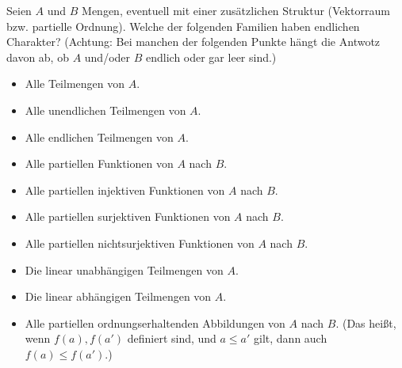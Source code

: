 
\begin{exercise}[280]

Seien $A$ und $B$ Mengen, eventuell mit einer zusätzlichen Struktur
(Vektorraum bzw. partielle Ordnung). Welche der folgenden Familien haben endlichen
Charakter? (Achtung: Bei manchen der folgenden Punkte hängt die Antwotz davon ab,
ob $A$ und/oder $B$ endlich oder gar leer sind.)

\begin{itemize}
  \item Alle Teilmengen von $A$.
  \item Alle unendlichen Teilmengen von $A$.
  \item Alle endlichen Teilmengen von $A$.
  \item Alle partiellen Funktionen von $A$ nach $B$.
  \item Alle partiellen injektiven Funktionen von $A$ nach $B$.
  \item Alle partiellen surjektiven Funktionen von $A$ nach $B$.
  \item Alle partiellen nichtsurjektiven Funktionen von $A$ nach $B$.
  \item Die linear unabhängigen Teilmengen von $A$.
  \item Die linear abhängigen Teilmengen von $A$.
  \item Alle partiellen ordnungserhaltenden Abbildungen von $A$ nach $B$.
  (Das heißt, wenn $f(a), f(a')$ definiert sind, und $a \leq a'$ gilt, dann
  auch $f(a) \leq f(a')$.)
\end{itemize}

\end{exercise}


\begin{solution}

\phantom{}

\end{solution}

